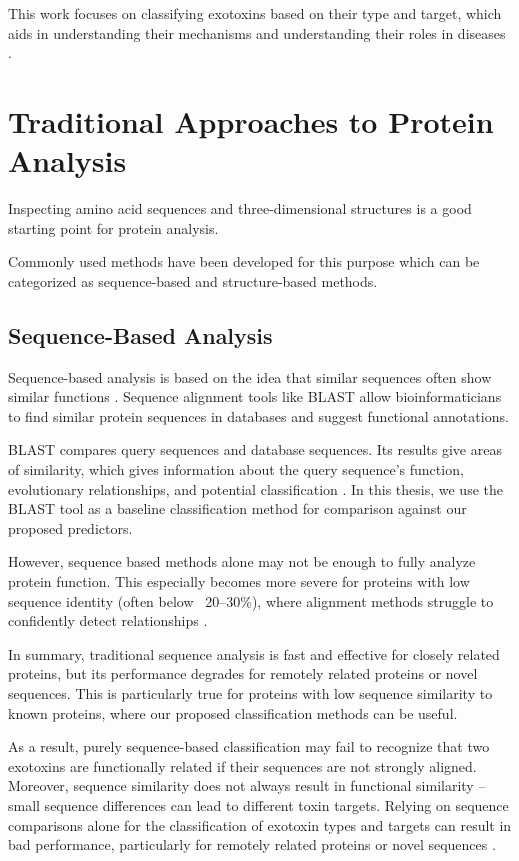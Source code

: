 This work focuses on classifying exotoxins based on their type and target, which aids in understanding their mechanisms and understanding their roles in diseases \cite{Ghazaei2022}.

\section{Traditional Approaches to Protein Analysis}

Inspecting amino acid sequences and three-dimensional structures is a good starting point for protein analysis.

Commonly used methods have been developed for this purpose which can be categorized as sequence-based and structure-based methods.

\subsection{Sequence-Based Analysis}

Sequence-based analysis is based on the idea that similar sequences often show similar functions \cite{durbin1998biological}.
Sequence alignment tools like \gls{BLAST} \cite{Camacho2009} allow bioinformaticians to find similar protein sequences in databases and suggest functional annotations.

\gls{BLAST} compares query sequences and database sequences. Its results give areas of similarity, which gives information about the query sequence's function, evolutionary relationships, and potential classification \cite{Camacho2009}.
In this thesis, we use the \gls{BLAST} tool as a baseline classification method for comparison against our proposed predictors.

However, sequence based methods alone may not be enough to fully analyze protein function.
This especially becomes more severe for proteins with low sequence identity (often below ~20–30\%), where alignment methods struggle to confidently detect relationships \cite{Rost1999} \cite{Bernardes2011}.

In summary, traditional sequence analysis is fast and effective for closely related proteins, but its performance degrades for remotely related proteins or novel sequences.
This is particularly true for proteins with low sequence similarity to known proteins, where our proposed classification methods can be useful.

As a result, purely sequence-based classification may fail to recognize that two exotoxins are functionally related if their sequences are not strongly aligned.
Moreover, sequence similarity does not always result in functional similarity – small sequence differences can lead to different toxin targets.
Relying on sequence comparisons alone for the classification of exotoxin types and targets can result in bad performance, particularly for remotely related proteins or novel sequences  \cite{Rost1999} \cite{Bernardes2011}.


